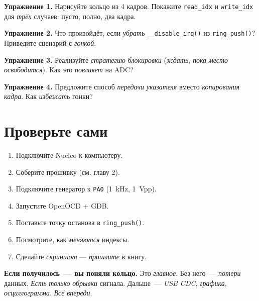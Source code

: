 \begin{exercisebox}
\textbf{Упражнение 1.} Нарисуйте кольцо из \num{4} кадров.
Покажите \texttt{read\_idx} и \texttt{write\_idx} для
\emph{трёх} случаев: пусто, полно, два кадра.
\end{exercisebox}

\begin{exercisebox}
\textbf{Упражнение 2.} Что произойдёт, если \emph{убрать}
\texttt{\_\_disable\_irq()} из \texttt{ring\_push()}?
Приведите сценарий с \emph{гонкой}.
\end{exercisebox}

\begin{exercisebox}
\textbf{Упражнение 3.} Реализуйте \emph{стратегию}
\emph{блокировки} (\emph{ждать}, \emph{пока} \emph{место}
\emph{освободится}). Как это \emph{повлияет} на ADC?
\end{exercisebox}

\begin{exercisebox}
\textbf{Упражнение 4.} Предложите способ \emph{передачи}
\emph{указателя} вместо \emph{копирования} \emph{кадра}.
Как \emph{избежать} гонки?
\end{exercisebox}

\section{Проверьте сами}
\label{sec:ring-check}

\begin{enumerate}
    \item Подключите Nucleo к компьютеру.
    \item Соберите прошивку (см. главу 2).
    \item Подключите генератор к \texttt{PA0} (\SI{1}{\kilo\hertz},
          \SI{1}{\volt}pp).
    \item Запустите OpenOCD + GDB.
    \item Поставьте точку останова в \texttt{ring\_push()}.
    \item Посмотрите, как \emph{меняются} индексы.
    \item Сделайте \emph{скриншот} — \emph{пришлите} в книгу.
\end{enumerate}

\begin{ideabox}
\textbf{Если получилось~--- вы поняли кольцо.} Это
\emph{главное}. Без него~--- \emph{потери} данных.
\emph{Есть} \emph{только} \emph{обрывки} сигнала. Дальше~---
\emph{USB CDC}, \emph{графика}, \emph{осциллограмма}.
\emph{Всё} \emph{впереди}.
\end{ideabox}
